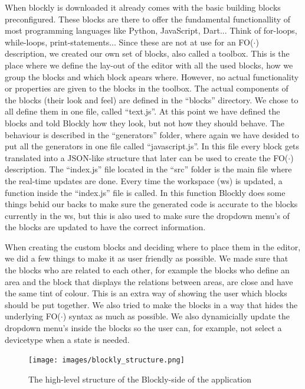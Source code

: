 \documentclass[11pt,a4paper]{report}
\newcommand{\fodot}{FO($\cdot$)\xspace}
\begin{document}
When blockly is downloaded it already comes with the basic building blocks preconfigured. These blocks are there to offer the fundamental functionallity of most programming languages like Python, JavaScript, Dart... Think of for-loops, while-loops, print-statements... Since these are not at use for an \fodot description, we created our own set of blocks, also called a toolbox. This is the place where we define the lay-out of the editor with all the used blocks, how we group the blocks and which block apears where. However, no actual functionality or properties are given to the blocks in the toolbox. The actual components of the blocks (their look and feel) are defined in the ``blocks'' directory. We chose to all define them in one file, called ``text.js''. At this point we have defined the blocks and told Blockly how they look, but not how they should behave. The behaviour is described in the ``generators'' folder, where again we have desided to put all the generators in one file called ``javascript.js''. In this file every block gets translated into a JSON-like structure that later can be used to create the \fodot description. The ``index.js'' file located in the ``src'' folder is the main file where the real-time updates are done. Every time the workspace (ws) is updated, a function inside the ``index.js'' file is called. In this function Blockly does some things behid our backs to make sure the generated code is accurate to the blocks currently in the ws, but this is also used to make sure the dropdown menu's of the blocks are updated to have the correct information.

When creating the custom blocks and deciding where to place them in the editor, we did a few things to make it as user friendly as possible. We made sure that the blocks who are related to each other, for example the blocks who define an area and the block that displays the relations between areas, are close and have the same tint of colour. This is an extra way of showing the user which blocks should be put together. We also tried to make the blocks in a way that hides the underlying \fodot syntax as much as possible. We also dynamicially update the dropdown menu's inside the blocks so the user can, for example, not select a devicetype when a state is needed.

\begin{figure}
    \centering
    \texttt{[image: images/blockly\_structure.png]}
    \caption{The high-level structure of the Blockly-side of the application}
    \label{fig:blockly_structure}
\end{figure}
\end{document}
